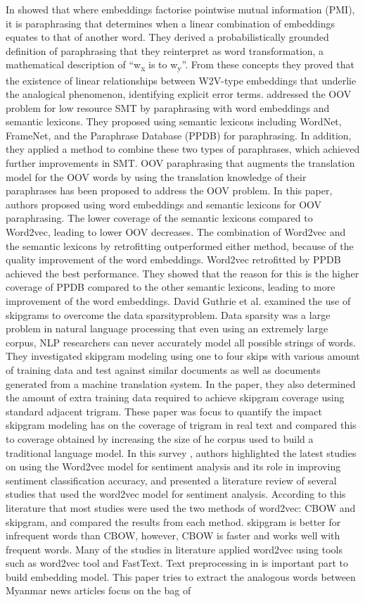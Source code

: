 \documentclass[conference]{IEEEtran}
\begin{document}
In \cite{b1} showed that where embeddings factorise pointwise mutual information (PMI), it is paraphrasing that determines when a linear combination of embeddings equates to that of another word. They derived a probabilistically grounded definition of paraphrasing that they reinterpret as word transformation, a mathematical description of  ``w\textsubscript{x} is to w\textsubscript{y}''. From these concepts they proved that the existence of linear relationships between W2V-type embeddings that underlie the analogical phenomenon, identifying explicit error terms. \cite{b2} addressed the OOV problem for low resource SMT by paraphrasing with word embeddings and semantic lexicons. They proposed using semantic lexicons including WordNet, FrameNet, and the Paraphrase Database (PPDB) for paraphrasing. In addition, they applied a method to combine these two types of paraphrases, which achieved further improvements in SMT. OOV paraphrasing that augments the translation model for the OOV words by using the translation knowledge of their paraphrases has been proposed to address the OOV problem. In this paper, authors proposed using word embeddings and semantic lexicons for OOV paraphrasing. The lower coverage of the semantic lexicons compared to Word2vec, leading to lower OOV decreases. The combination of Word2vec and the semantic lexicons by retrofitting outperformed either method, because of the quality improvement of the word embeddings. Word2vec retrofitted by PPDB achieved the best performance. They showed that the reason for this is the higher coverage of PPDB compared to the other semantic lexicons, leading to more improvement of the word embeddings.  David Guthrie et al. \cite{b3} examined the use of skipgrams to overcome the data sparsityproblem. Data sparsity was a large problem in natural language processing that even using an extremely large corpus, NLP researchers can never accurately model all possible strings of words. They investigated skipgram modeling using one to four skips with various amount of training data and test against similar documents as well as documents generated from a machine translation system. In the paper, they also determined the amount of extra training data required to achieve skipgram coverage using standard adjacent trigram. These paper was focus to quantify the impact skipgram modeling has on the coverage of trigram in real text and compared this to coverage obtained by increasing the size of he corpus used to build a traditional language model. In this survey \cite{b4}, authors highlighted the latest studies on using the Word2vec model for sentiment analysis and its role in improving sentiment classification accuracy, and presented a literature review of several studies that used the word2vec model for sentiment analysis. According to this literature that most studies were used the two methods of word2vec: CBOW and skipgram, and compared the results from each method. skipgram is better for infrequent words than CBOW, however, CBOW is faster and works well with frequent words. Many of the studies in literature applied word2vec using tools such as word2vec tool and FastText. Text preprocessing in \cite{b5} is important part to build embedding model. This paper tries to extract the analogous words between Myanmar news articles focus on the bag of 
\end{document}
